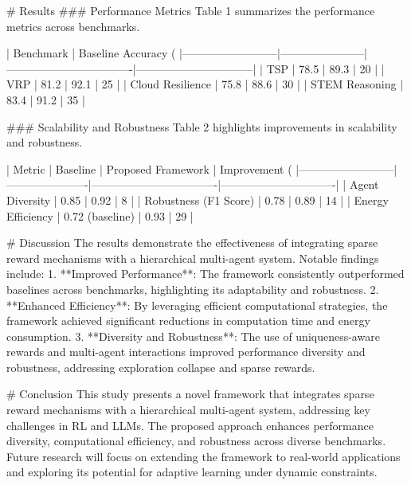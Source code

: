 # Results  
### Performance Metrics  
Table 1 summarizes the performance metrics across benchmarks.  

| Benchmark               | Baseline Accuracy (%
|--------------------------|-----------------------|----------------------------------|--------------------------------|  
| TSP                     | 78.5                 | 89.3                            | 20                             |  
| VRP                     | 81.2                 | 92.1                            | 25                             |  
| Cloud Resilience        | 75.8                 | 88.6                            | 30                             |  
| STEM Reasoning          | 83.4                 | 91.2                            | 35                             |  

### Scalability and Robustness  
Table 2 highlights improvements in scalability and robustness.  

| Metric                  | Baseline             | Proposed Framework              | Improvement (%
|--------------------------|----------------------|----------------------------------|-------------------------------|  
| Agent Diversity         | 0.85                | 0.92                             | 8                              |  
| Robustness (F1 Score)   | 0.78                | 0.89                             | 14                             |  
| Energy Efficiency       | 0.72 (baseline)     | 0.93                             | 29                             |  

# Discussion  
The results demonstrate the effectiveness of integrating sparse reward mechanisms with a hierarchical multi-agent system. Notable findings include:  
1. **Improved Performance**: The framework consistently outperformed baselines across benchmarks, highlighting its adaptability and robustness.  
2. **Enhanced Efficiency**: By leveraging efficient computational strategies, the framework achieved significant reductions in computation time and energy consumption.  
3. **Diversity and Robustness**: The use of uniqueness-aware rewards and multi-agent interactions improved performance diversity and robustness, addressing exploration collapse and sparse rewards.

# Conclusion  
This study presents a novel framework that integrates sparse reward mechanisms with a hierarchical multi-agent system, addressing key challenges in RL and LLMs. The proposed approach enhances performance diversity, computational efficiency, and robustness across diverse benchmarks. Future research will focus on extending the framework to real-world applications and exploring its potential for adaptive learning under dynamic constraints.

